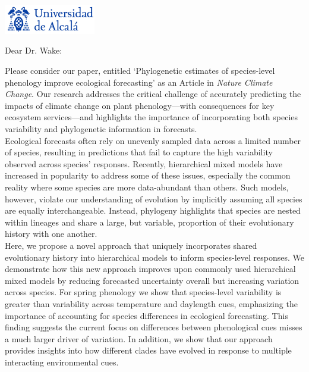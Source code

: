 \documentclass[11pt,a4paper]{letter}
\begin{document}
\begin{letter}{}
\includegraphics[width=0.3\textwidth]{logo_uah.png}

\opening{Dear Dr. Wake:}

\noindent Please consider our paper, entitled `Phylogenetic estimates of species-level phenology improve ecological forecasting' as an Article in \emph{Nature Climate Change}. Our research addresses the critical challenge of accurately predicting the impacts of climate change on plant phenology---with consequences for key ecosystem services---and highlights the importance of incorporating both species variability and phylogenetic information in forecasts.
\vspace{1.5ex}\\
Ecological forecasts often rely on unevenly sampled data across a limited number of species, resulting in predictions that fail to capture the high variability observed across species' responses. Recently, hierarchical mixed models have increased in popularity to address some of these issues, especially the common reality where some species are more data-abundant than others. Such models, however, violate our understanding of evolution by implicitly assuming all species are equally interchangeable. Instead, phylogeny highlights that species are nested within lineages and share a large, but variable, proportion of their evolutionary history with one another. %
\vspace{1.5ex}\\
Here, we propose a novel approach that uniquely incorporates shared evolutionary history into hierarchical models to inform species-level responses. We demonstrate how this new approach improves upon commonly used hierarchical mixed models by reducing forecasted uncertainty overall but increasing variation across species. For spring phenology we show that species-level variability is greater than variability across temperature and daylength cues, emphasizing the importance of accounting for species differences in ecological forecasting. This finding suggests the current focus on differences between phenological cues misses a much larger driver of variation. In addition, we show that our approach provides insights into how different clades have evolved in response to multiple interacting environmental cues.

\end{letter}
\end{document}
